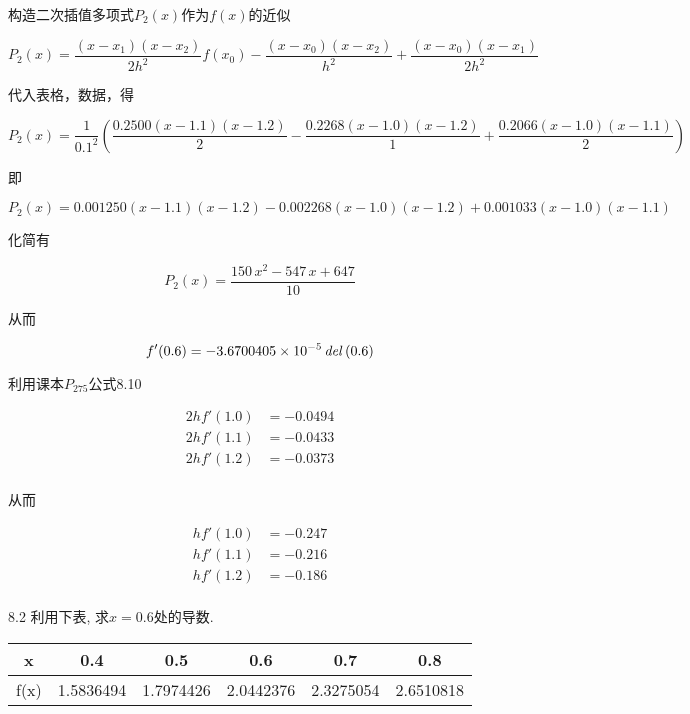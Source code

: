 \documentclass[a4paper, 10pt]{article}
\begin{document}
\begin{CJK}{UTF8}{gbsn}
构造二次插值多项式$P_2(x)$作为$f(x)$的近似

\begin{equation*}
	P_{2}(x) = \frac{(x-x_{1})(x-x_{2})}{2h^2}f(x_0) - \frac{(x-x_0)(x-x_2)}{h^2} + \frac{(x-x_0)(x-x_1)}{2h^2}
\end{equation*}

代入表格，数据，得

\begin{equation*}
	P_2(x) = \frac{1}{0.1^2}(\frac{0.2500(x-1.1)(x-1.2)}{2}-\frac{0.2268(x-1.0)(x-1.2)}{1}+\frac{0.2066(x-1.0)(x-1.1)}{2})
\end{equation*}

即

\begin{equation*}
	P_2(x) = 0.001250(x-1.1)(x-1.2) - 0.002268(x-1.0)(x-1.2) + 0.001033(x-1.0)(x-1.1)
\end{equation*}

化简有

\begin{equation}
	P_2(x) = \frac{150\,x^2-547\,x+647}{10}
\end{equation}

从而

\begin{equation}
	f'(0.6) = -3.6700405 \times 10^{-5}\,{\it del}\left(0.6\right)
\end{equation}

利用课本$P_{275}$公式8.10

\begin{align*}
	2hf'(1.0) & = -0.0494 \\
	2hf'(1.1) & = -0.0433 \\
	2hf'(1.2) & = -0.0373 \\
\end{align*}

从而

\begin{align*}
	hf'(1.0) & = -0.247 \\
	hf'(1.1) & = -0.216 \\
	hf'(1.2) & = -0.186 \\
\end{align*}

8.2
利用下表, 求$x=0.6$处的导数.\\

\begin{tabular}{c| c c c c c}
\hline
x    & 0.4       & 0.5       & 0.6       & 0.7       & 0.8 \\
\hline
f(x) & 1.5836494 & 1.7974426 & 2.0442376 & 2.3275054 & 2.6510818 \\
\hline
\end{tabular}


\end{CJK}
\end{document}
